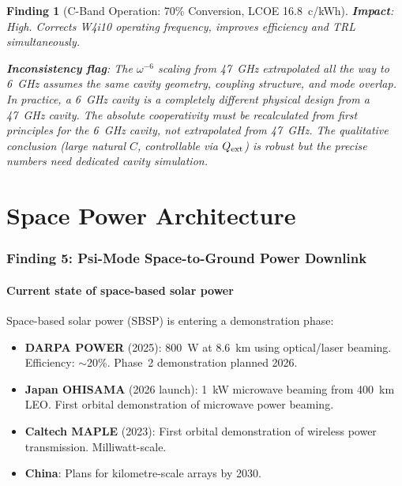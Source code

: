 \documentclass[11pt]{article}
\newtheorem{finding}{Finding}
\begin{document}
\begin{finding}[C-Band Operation: 70\% Conversion, LCOE 16.8~c/kWh]
\textbf{Impact}: High. Corrects W4i10 operating frequency, improves
efficiency and TRL simultaneously.

\textbf{Inconsistency flag}: The $\omega^{-6}$ scaling from 47~GHz
extrapolated all the way to 6~GHz assumes the \emph{same} cavity geometry,
coupling structure, and mode overlap. In practice, a 6~GHz cavity is
a completely different physical design from a 47~GHz cavity. The absolute
cooperativity must be recalculated from first principles for the 6~GHz
cavity, not extrapolated from 47~GHz. The qualitative conclusion (large
natural $C$, controllable via $Q_{\rm ext}$) is robust but the precise
numbers need dedicated cavity simulation.
\end{finding}

\part{Space Power Architecture}
\label{part:space}

\section{Finding 5: Psi-Mode Space-to-Ground Power Downlink}
\label{sec:space-power}

\subsection{Current state of space-based solar power}

Space-based solar power (SBSP) is entering a demonstration phase:

\begin{itemize}[nosep]
\item \textbf{DARPA POWER} (2025): 800~W at 8.6~km using optical/laser
  beaming. Efficiency: $\sim$20\%. Phase~2 demonstration planned 2026.
\item \textbf{Japan OHISAMA} (2026 launch): 1~kW microwave beaming from
  400~km LEO. First orbital demonstration of microwave power beaming.
\item \textbf{Caltech MAPLE} (2023): First orbital demonstration of
  wireless power transmission. Milliwatt-scale.
\item \textbf{China}: Plans for kilometre-scale arrays by 2030.
\end{itemize}
\end{document}

